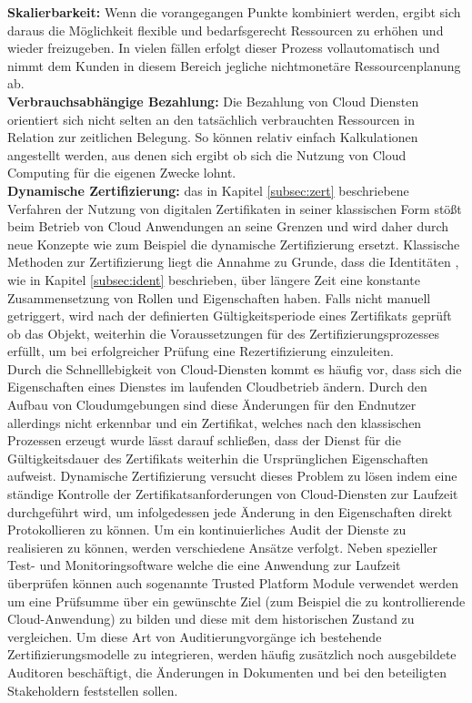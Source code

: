 \documentclass[
book,
a4paper,   
titlepage,  
halfparskip,
12pt        
]{scrartcl}
\begin{document}
\begin{onehalfspacing}
\textbf{Skalierbarkeit:} Wenn die vorangegangen Punkte kombiniert werden, ergibt sich daraus die Möglichkeit flexible und bedarfsgerecht Ressourcen zu erhöhen und wieder freizugeben. In vielen fällen erfolgt dieser Prozess vollautomatisch und nimmt dem Kunden in diesem Bereich jegliche nichtmonetäre Ressourcenplanung ab.
\cite[S. 9]{cloudsec}\\
\textbf{Verbrauchsabhängige Bezahlung:} Die Bezahlung von Cloud Diensten orientiert sich nicht selten an den tatsächlich verbrauchten Ressourcen in Relation zur zeitlichen Belegung. So können relativ einfach Kalkulationen angestellt werden, aus denen sich ergibt ob sich die Nutzung von Cloud Computing für die eigenen Zwecke lohnt.
\cite[S. 9]{cloudsec}\\

\textbf{Dynamische Zertifizierung:} das in Kapitel \vref{subsec:zert} beschriebene Verfahren der Nutzung von digitalen Zertifikaten in seiner klassischen Form stößt beim Betrieb von Cloud Anwendungen an seine Grenzen und wird daher durch neue Konzepte wie zum Beispiel die dynamische Zertifizierung ersetzt. Klassische Methoden zur Zertifizierung liegt die Annahme zu Grunde, dass die Identitäten , wie in Kapitel \vref{subsec:ident} beschrieben, über längere Zeit eine konstante Zusammensetzung von Rollen und Eigenschaften haben. Falls nicht manuell getriggert, wird nach der definierten Gültigkeitsperiode eines Zertifikats geprüft ob das Objekt, weiterhin die Voraussetzungen für des Zertifizierungsprozesses erfüllt, um bei erfolgreicher Prüfung eine Rezertifizierung einzuleiten.\cite{cloudabs}\\
Durch die Schnelllebigkeit von Cloud-Diensten kommt es häufig vor, dass sich die Eigenschaften eines Dienstes im laufenden Cloudbetrieb ändern. Durch den Aufbau von Cloudumgebungen sind diese Änderungen für den Endnutzer allerdings nicht erkennbar und ein Zertifikat, welches nach den klassischen Prozessen erzeugt wurde lässt darauf schließen, dass der Dienst für die Gültigkeitsdauer des Zertifikats weiterhin die Ursprünglichen Eigenschaften aufweist. Dynamische Zertifizierung versucht dieses Problem zu lösen indem eine ständige Kontrolle der Zertifikatsanforderungen von Cloud-Diensten zur Laufzeit durchgeführt wird, um infolgedessen jede Änderung in den Eigenschaften direkt Protokollieren zu können. Um ein kontinuierliches Audit der Dienste zu realisieren zu können, werden verschiedene Ansätze verfolgt. Neben spezieller Test- und Monitoringsoftware welche die eine Anwendung zur Laufzeit überprüfen können auch sogenannte Trusted Platform Module verwendet werden um eine Prüfsumme über ein gewünschte Ziel (zum Beispiel die zu kontrollierende Cloud-Anwendung) zu bilden und diese mit dem historischen Zustand zu vergleichen. Um diese Art von Auditierungvorgänge ich bestehende Zertifizierungsmodelle zu integrieren, werden häufig zusätzlich noch ausgebildete Auditoren beschäftigt, die Änderungen in Dokumenten und bei den beteiligten Stakeholdern feststellen sollen.\cite[S. 114ff]{cloudsec}


\end{onehalfspacing}
\end{document}
